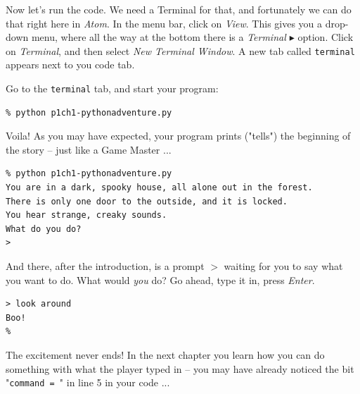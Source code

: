 Now let's run the code. We need a Terminal for that, and fortunately we can do that right here in \emph{Atom}. In the menu bar, click on \emph{View}. This gives you a drop-down menu, where all the way at the bottom there is a \emph{Terminal $\blacktriangleright$} option. Click on \emph{Terminal}, and then select \emph{New Terminal Window}. A new tab called \texttt{terminal} appears next to you code tab. 

Go to the \texttt{terminal} tab, and start your program:  

\begin{verbatim}
% python p1ch1-pythonadventure.py
\end{verbatim}

Voila! As you may have expected, your program prints ("tells") the beginning of the story -- just like a Game Master ... 

\begin{verbatim}
% python p1ch1-pythonadventure.py
You are in a dark, spooky house, all alone out in the forest.
There is only one door to the outside, and it is locked.
You hear strange, creaky sounds.
What do you do?
>
\end{verbatim} 

And there, after the introduction, is a prompt $>$ waiting for you to say what you want to do. What would \emph{you} do? Go ahead, type it in, press \emph{Enter}. 

\begin{verbatim}
> look around
Boo!
% 
\end{verbatim}

The excitement never ends! In the next chapter you learn how you can do something with what the player typed in -- you may have already noticed the bit "\texttt{command = }" in line 5 in your code ...   



   
   
   
   
   